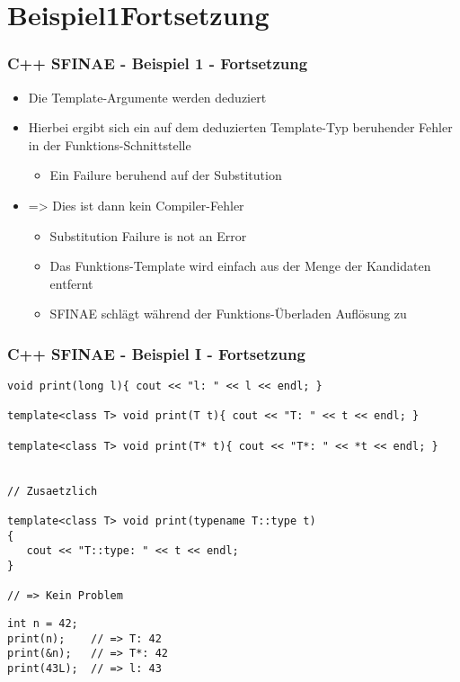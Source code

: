 \documentclass{beamer}
\begin{document}
\section{Beispiel1Fortsetzung}
\begin{frame}
\frametitle{C++ SFINAE - Beispiel 1 - Fortsetzung}

\begin{itemize}
\item Die Template-Argumente werden deduziert
\item Hierbei ergibt sich ein auf dem deduzierten Template-Typ beruhender Fehler in der Funktions-Schnittstelle
\begin{itemize}
\item Ein \glqq{}Failure\grqq{} beruhend auf der \glqq{}Substitution\grqq{}
\end{itemize}

\item => Dies ist dann kein Compiler-Fehler
\begin{itemize}
\item Substitution Failure is not an Error
\item Das Funktions-Template wird einfach aus der Menge der Kandidaten entfernt
\item SFINAE  schlägt während der Funktions-Überladen Auflösung zu
\end{itemize}

\end{itemize}
\end{frame}

\begin{frame}[fragile]
\frametitle{C++ SFINAE - Beispiel I - Fortsetzung}
\begin{lstlisting}
void print(long l){ cout << "l: " << l << endl; }

template<class T> void print(T t){ cout << "T: " << t << endl; }

template<class T> void print(T* t){ cout << "T*: " << *t << endl; }


// Zusaetzlich

template<class T> void print(typename T::type t)
{
   cout << "T::type: " << t << endl;
}

// => Kein Problem
\end{lstlisting}


\begin{lstlisting}
int n = 42;
print(n);    // => T: 42
print(&n);   // => T*: 42
print(43L);  // => l: 43
\end{lstlisting}
\end{frame}
\end{document}
